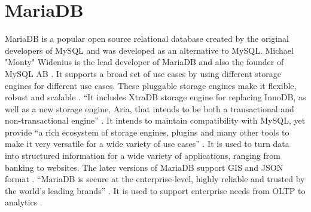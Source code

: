 \section{MariaDB}
 
MariaDB is a popular open source relational database created by the
original developers of MySQL and was developed as an alternative to
MySQL. Michael "Monty" Widenius is the lead developer of MariaDB and
also the founder of MySQL AB \cite{wiki-MariaDB}. It supports a broad
set of use cases by using different storage engines for different use
cases. These pluggable storage engines make it flexible, robust and
scalable \cite{mariadb-server}. “It includes XtraDB storage engine for
replacing InnoDB, as well as a new storage engine, Aria, that intends
to be both a transactional and non-transactional engine”
\cite{wiki-MariaDB}. It intends to maintain compatibility with
MySQL\cite{wiki-MariaDB}, yet provide “a rich ecosystem of storage
engines, plugins and many other tools to make it very versatile for a
wide variety of use cases” \cite{www-mariadb-org}. It is used to turn
data into structured information for a wide variety of applications,
ranging from banking to websites. The later versions of MariaDB
support GIS and JSON format \cite{www-mariabdb-org}. “MariaDB is
secure at the enterprise-level, highly reliable and trusted by the
world’s leading brands” \cite{about-mariadb}. It is used to support
enterprise needs from OLTP to analytics \cite{about-mariadb}.
 

